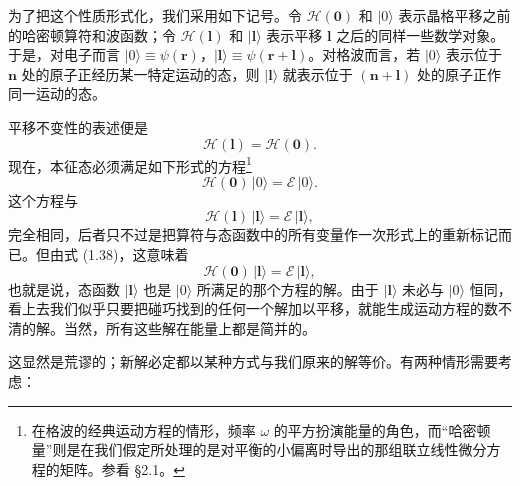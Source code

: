 为了把这个性质形式化，我们采用如下记号。令 $\mathcal{H}(\mathbf{0})$ 和 $|0\rangle$ 表示晶格平移之前的哈密顿算符和波函数；令 $\mathcal{H}(\mathbf{l})$ 和 $|\mathbf{l}\rangle$ 表示平移 $\mathbf{l}$ 之后的同样一些数学对象。于是，对电子而言 $|0\rangle\equiv\psi(\mathbf{r})$，$|\mathbf{l}\rangle\equiv\psi(\mathbf{r}+\mathbf{l})$。对格波而言，若 $|0\rangle$ 表示位于 $\mathbf{n}$ 处的原子正经历某一特定运动的态，则 $|\mathbf{l}\rangle$ 就表示位于 $(\mathbf{n}+\mathbf{l})$ 处的原子正作同一运动的态。

平移不变性的表述便是
\begin{equation*}
\mathcal{H}(\mathbf{l})=\mathcal{H}(\mathbf{0}).
\tag{1.38}
\end{equation*}
现在，本征态必须满足如下形式的方程\footnote{在格波的经典运动方程的情形，频率 $\omega$ 的平方扮演能量的角色，而“哈密顿量”则是在我们假定所处理的是对平衡的小偏离时导出的那组联立线性微分方程的矩阵。参看 §2.1。}
\begin{equation*}
\mathcal{H}(\mathbf{0})\,|0\rangle=\mathcal{E}\,|0\rangle.
\tag{1.39}
\end{equation*}
这个方程与
\begin{equation*}
\mathcal{H}(\mathbf{l})\,|\mathbf{l}\rangle=\mathcal{E}\,|\mathbf{l}\rangle,
\tag{1.40}
\end{equation*}
完全相同，后者只不过是把算符与态函数中的所有变量作一次形式上的重新标记而已。但由式 (1.38)，这意味着
\begin{equation*}
\mathcal{H}(\mathbf{0})\,|\mathbf{l}\rangle=\mathcal{E}\,|\mathbf{l}\rangle,
\tag{1.41}
\end{equation*}
也就是说，态函数 $|\mathbf{l}\rangle$ 也是 $|0\rangle$ 所满足的那个方程的解。由于 $|\mathbf{l}\rangle$ 未必与 $|0\rangle$ 恒同，看上去我们似乎只要把碰巧找到的任何一个解加以平移，就能生成运动方程的数不清的解。当然，所有这些解在能量上都是简并的。

这显然是荒谬的；新解必定都以某种方式与我们原来的解等价。有两种情形需要考虑：

